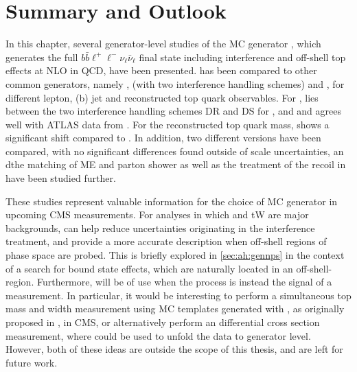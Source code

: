 \section{Summary and Outlook}

In this chapter, several generator-level studies of the MC generator \bbfourl, which generates the full $b \bar{b} \ell^+ \ell^- \nu_{\ell} \bar{\nu}_{\ell}$ final state including \tttW interference and off-shell top effects at NLO in QCD, have been presented. \bbfourl has been compared to other common \ttbar generators, namely \hvq, \ST (with two interference handling schemes) and \ttb, for different lepton, (b) jet and reconstructed top quark observables. For \mblminimax, \bbfourl lies between the two interference handling schemes DR and DS for \tttWsum, and and agrees well with ATLAS data from . For the reconstructed top quark mass, \bbfourl shows a significant shift compared to \tttWsum. In addition, two different \bbfourl versions have been compared, with no significant differences found outside of scale uncertainties, an dthe matching of ME and parton shower as well as the treatment of the recoil in \bbfourl have been studied further.

These studies represent valuable information for the choice of \ttbar MC generator in upcoming CMS measurements. For analyses in which \ttbar and tW are major backgrounds, \bbfourl can help reduce uncertainties originating in the \tttW interference treatment, and provide a more accurate description when off-shell regions of phase space are probed. This is briefly explored in \cref{sec:ah:gennps} in the context of a search for \ttbar bound state effects, which are naturally located in an off-shell-region. Furthermore, \bbfourl will be of use when the \pptt process is instead the signal of a measurement. In particular, it would be interesting to perform a simultaneous top mass and width measurement using MC templates generated with \bbfourl, as originally proposed in , in CMS, or alternatively perform an differential \tttWsum cross section measurement, where \bbfourl could be used to unfold the data to generator level. However, both of these ideas are outside the scope of this thesis, and are left for future work.